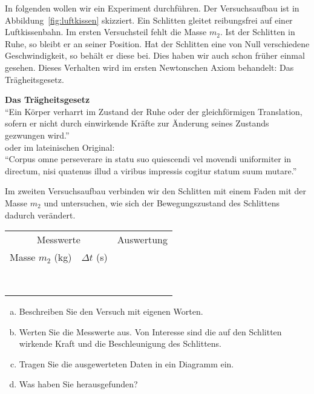 In folgenden wollen wir ein Experiment durchführen.
Der Versuchsaufbau ist in Abbildung~\ref{fig:luftkissen} skizziert. Ein Schlitten gleitet reibungsfrei
auf einer Luftkissenbahn. 
Im ersten Versuchsteil fehlt die Masse $m_2$. Ist der Schlitten
in Ruhe, so bleibt er an seiner Position. Hat der Schlitten eine von Null verschiedene Geschwindigkeit,
so behält er diese bei. Dies haben wir auch schon früher einmal gesehen.
Dieses Verhalten wird im ersten Newtonschen Axiom behandelt: Das Trägheitsgesetz.

\begin{cbox}
	\textbf{Das Trägheitsgesetz}\\
	``Ein Körper verharrt im Zustand der Ruhe oder der gleichförmigen Translation, sofern er nicht durch einwirkende Kräfte zur Änderung seines Zustands gezwungen wird.''\\oder im lateinischen Original:\\
	``Corpus omne perseverare in statu suo quiescendi vel movendi uniformiter in directum, nisi quatenus illud a viribus impressis cogitur statum suum mutare.''
\end{cbox}

Im zweiten Versuchsaufbau verbinden wir den Schlitten mit einem Faden mit der Masse $m_2$
und untersuchen, wie sich der Bewegungszustand des Schlittens dadurch verändert.


\newcommand\lZIIII{\phantom{x} & \phantom{x} & \phantom{x} & \phantom{x}\\\hline}
\begin{center}
	\begin{tabular}{p{}|p{}||p{}p{}}
		\multicolumn{2}{c}{Messwerte} & \multicolumn{2}{c}{Auswertung}\\ 
    Masse $m_2$ (kg) & $\Delta t$ (s) & & \\\hline
	\lZIIII
	\lZIIII
	\lZIIII
	\lZIIII
	\lZIIII
	\lZIIII
	\lZIIII
	\lZIIII
	\end{tabular}
\end{center}

\begin{aufgabe}
	\label{Fma}
	\begin{enumerate}[a)]
		\item	Beschreiben Sie den Versuch mit eigenen Worten.
		\item Werten Sie die Messwerte aus. Von Interesse sind die auf den Schlitten wirkende Kraft und die Beschleunigung des Schlittens.
		\item Tragen Sie die ausgewerteten Daten in ein Diagramm ein.
		\item Was haben Sie herausgefunden?
	\end{enumerate}
\end{aufgabe}

